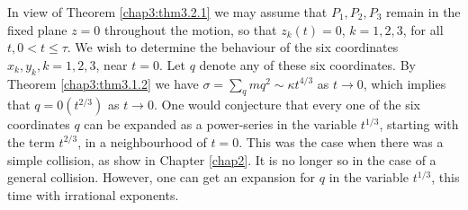 In view of Theorem \ref{chap3:thm3.2.1} we may assume that $P_1, P_2,
P_3$ remain in the fixed plane $z = 0 $ throughout the motion, so that
$z_k(t) = 0$, $k =1,2,3$, for all $t, 0 < t \leq \tau$. We wish to
determine the behaviour of the six coordinates $x_k , y_k, k = 1,2,3$,
near $t = 0$. Let $q$ denote any of these six coordinates. By Theorem
\ref{chap3:thm3.1.2} we have $\sigma = \sum\limits_q mq^2 \sim \kappa
t^{4/3}$ as $t \to 0$, which implies that $q = 0 (t^{2/3})$ as $t \to
0$. One would conjecture that every one of the six coordinates $q$ can
be expanded as a power-series in the variable $t^{1/3}$, starting with
the term $t^{2/3}$, in a neighbourhood of $t = 0$. This was the case
when there was a simple collision, as show in Chapter \ref{chap2}. It
is no longer so in the case of a general collision. However, one can
get an expansion for $q$ in the variable $t^{1/3}$, this time with
irrational exponents. 

